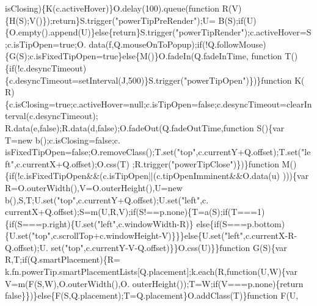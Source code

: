 \begin{DoxyCode}
{      isClosing)\{K(c.activeHover)\}O.delay(100).queue(\textcolor{keyword}{function} R(V)\{H(S);V()\});\textcolor{keywordflow}{return}\}S.trigger(\textcolor{stringliteral}{"powerTipPreRender"});U=
      B(S);\textcolor{keywordflow}{if}(U)\{O.empty().append(U)\}\textcolor{keywordflow}{else}\{\textcolor{keywordflow}{return}\}S.trigger(\textcolor{stringliteral}{"powerTipRender"});c.activeHover=S;c.isTipOpen=\textcolor{keyword}{true};O.
      data(f,Q.mouseOnToPopup);\textcolor{keywordflow}{if}(!Q.followMouse)\{G(S);c.isFixedTipOpen=\textcolor{keyword}{true}\}\textcolor{keywordflow}{else}\{M()\}O.fadeIn(Q.fadeInTime,\textcolor{keyword}{
      function} T()\{\textcolor{keywordflow}{if}(!c.desyncTimeout)\{c.desyncTimeout=setInterval(J,500)\}S.trigger(\textcolor{stringliteral}{"powerTipOpen"})\})\}\textcolor{keyword}{function} K(
      R)\{c.isClosing=\textcolor{keyword}{true};c.activeHover=null;c.isTipOpen=\textcolor{keyword}{false};c.desyncTimeout=clearInterval(c.desyncTimeout);
      R.data(e,\textcolor{keyword}{false});R.data(d,\textcolor{keyword}{false});O.fadeOut(Q.fadeOutTime,\textcolor{keyword}{function} S()\{var T=\textcolor{keyword}{new} b();c.isClosing=\textcolor{keyword}{false};c.
      isFixedTipOpen=\textcolor{keyword}{false};O.removeClass();T.set(\textcolor{stringliteral}{"top"},c.currentY+Q.offset);T.set(\textcolor{stringliteral}{"left"},c.currentX+Q.offset);O.css(T)
      ;R.trigger(\textcolor{stringliteral}{"powerTipClose"})\})\}\textcolor{keyword}{function} M()\{\textcolor{keywordflow}{if}(!c.isFixedTipOpen&&(c.isTipOpen||(c.tipOpenImminent&&O.data(u)
      )))\{var R=O.outerWidth(),V=O.outerHeight(),U=\textcolor{keyword}{new} b(),S,T;U.set(\textcolor{stringliteral}{"top"},c.currentY+Q.offset);U.set(\textcolor{stringliteral}{"left"},c.
      currentX+Q.offset);S=m(U,R,V);\textcolor{keywordflow}{if}(S!==p.none)\{T=a(S);\textcolor{keywordflow}{if}(T===1)\{\textcolor{keywordflow}{if}(S===p.right)\{U.set(\textcolor{stringliteral}{"left"},c.windowWidth-R)\}\textcolor{keywordflow}{
      else}\{\textcolor{keywordflow}{if}(S===p.bottom)\{U.set(\textcolor{stringliteral}{"top"},c.scrollTop+c.windowHeight-V)\}\}\}\textcolor{keywordflow}{else}\{U.set(\textcolor{stringliteral}{"left"},c.currentX-R-Q.offset);U.
      set(\textcolor{stringliteral}{"top"},c.currentY-V-Q.offset)\}\}O.css(U)\}\}\textcolor{keyword}{function} G(S)\{var R,T;\textcolor{keywordflow}{if}(Q.smartPlacement)\{R=
      k.fn.powerTip.smartPlacementLists[Q.placement];k.each(R,\textcolor{keyword}{function}(U,W)\{var V=m(F(S,W),O.outerWidth(),O.
      outerHeight());T=W;\textcolor{keywordflow}{if}(V===p.none)\{\textcolor{keywordflow}{return} \textcolor{keyword}{false}\}\})\}\textcolor{keywordflow}{else}\{F(S,Q.placement);T=Q.placement\}O.addClass(T)\}\textcolor{keyword}{function} F(U,
}
\end{DoxyCode}
